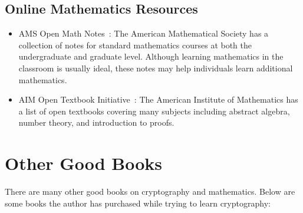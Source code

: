 \subsection{Online Mathematics Resources}
\label{ssec:conclusion_online_math}

\begin{itemize}
\item AMS Open Math Notes~\cite{AMSOpenMathNotes}:
    The American Mathematical Society has a collection of notes
    for standard mathematics courses at both the undergraduate
    and graduate level.
    Although learning mathematics in the classroom is usually ideal,
    these notes may help individuals learn additional
    mathematics.
\item AIM Open Textbook Initiative~\cite{AIMTextbooks}:
    The American Institute of Mathematics has a list of open textbooks
    covering many subjects including abstract algebra, \gls{number theory},
    and introduction to proofs.
\end{itemize}



\section{Other Good Books}

There are many other good books on cryptography and mathematics.
Below are some books the author has purchased while trying
to learn cryptography:

